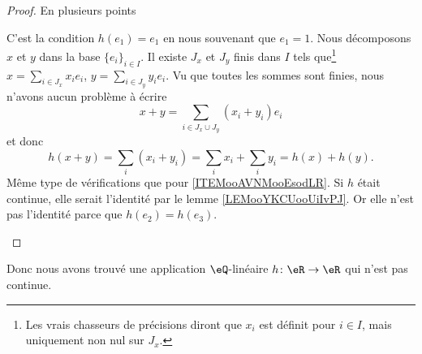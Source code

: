 \begin{proof}
    En plusieurs points
    \begin{subproof}
     C'est la condition \( h(e_1)=e_1\) en nous souvenant que \( e_1=1\).
     Nous décomposons \( x\) et \( y\) dans la base  \( \{ e_i \}_{i\in I}\). Il existe \( J_x\) et \( J_y \) finis dans \( I\) tels que\footnote{Les vrais chasseurs de précisions diront que \( x_i\) est définit pour \( i\in I\), mais uniquement non nul sur \( J_x\).} \( x=\sum_{i\in J_x}x_ie_i\), \( y=\sum_{i\in J_y}y_ie_i\). Vu que toutes les sommes sont finies, nous n'avons aucun problème à écrire
        \begin{equation}
            x+y=\sum_{i\in J_x\cup J_y}(x_i+y_i)e_i
        \end{equation}
        et donc
        \begin{equation}
            h(x+y)=\sum_i(x_i+y_i)=\sum_i x_i+\sum_i y_i=h(x)+h(y).
        \end{equation}
    Même type de vérifications que pour \ref{ITEMooAVNMooEsodLR}.
    Si \( h\) était continue, elle serait l'identité par le lemme \ref{LEMooYKCUooUiIvPJ}. Or elle n'est pas l'identité parce que \( h(e_2)=h(e_3)\).
    \end{subproof}
\end{proof}

Donc nous avons trouvé une application \( \eQ\)-linéaire \( h\colon \eR\to \eR\) qui n'est pas continue.

